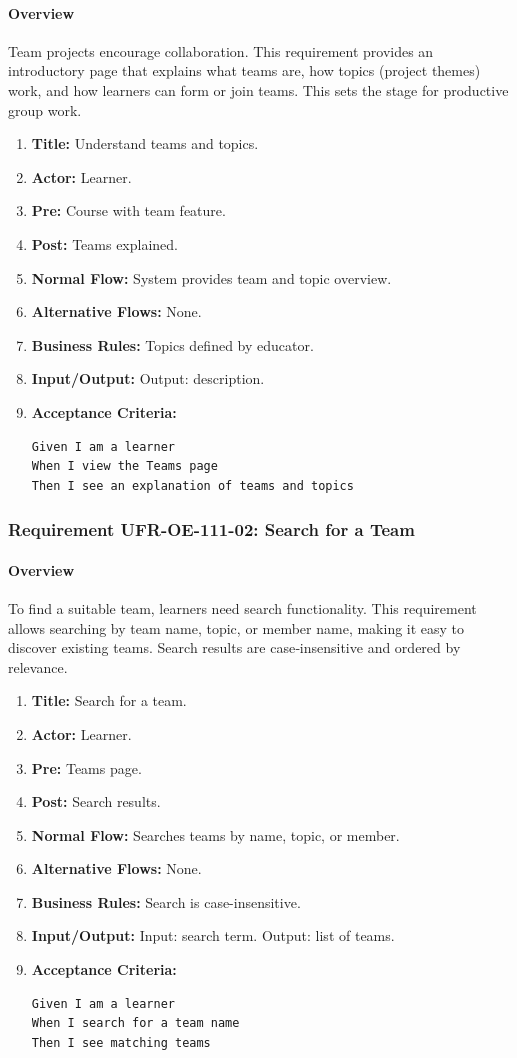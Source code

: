 \paragraph{Overview}
Team projects encourage collaboration. This requirement provides an introductory page that explains what teams are, how topics (project themes) work, and how learners can form or join teams. This sets the stage for productive group work.
\begin{enumerate}[label=\textbf{\arabic*.}]
\item \textbf{Title:} Understand teams and topics.
\item \textbf{Actor:} Learner.
\item \textbf{Pre:} Course with team feature.
\item \textbf{Post:} Teams explained.
\item \textbf{Normal Flow:} System provides team and topic overview.
\item \textbf{Alternative Flows:} None.
\item \textbf{Business Rules:} Topics defined by educator.
\item \textbf{Input/Output:} Output: description.
\item \textbf{Acceptance Criteria:}
    \begin{verbatim}
Given I am a learner
When I view the Teams page
Then I see an explanation of teams and topics
    \end{verbatim}
\end{enumerate}

\subsubsection{Requirement UFR-OE-111-02: Search for a Team}
\paragraph{Overview}
To find a suitable team, learners need search functionality. This requirement allows searching by team name, topic, or member name, making it easy to discover existing teams. Search results are case‑insensitive and ordered by relevance.
\begin{enumerate}[label=\textbf{\arabic*.}]
\item \textbf{Title:} Search for a team.
\item \textbf{Actor:} Learner.
\item \textbf{Pre:} Teams page.
\item \textbf{Post:} Search results.
\item \textbf{Normal Flow:} Searches teams by name, topic, or member.
\item \textbf{Alternative Flows:} None.
\item \textbf{Business Rules:} Search is case-insensitive.
\item \textbf{Input/Output:} Input: search term. Output: list of teams.
\item \textbf{Acceptance Criteria:}
    \begin{verbatim}
Given I am a learner
When I search for a team name
Then I see matching teams
    \end{verbatim}
\end{enumerate}

